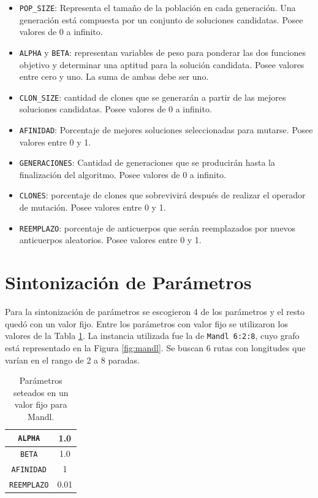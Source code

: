 \documentclass{llncs}
\begin{document}
\begin{itemize}
\item \texttt{POP\_SIZE}: Representa el tamaño de la población en cada generación. Una generación está compuesta por un conjunto de soluciones candidatas. Posee valores de 0 a infinito.
\item \texttt{ALPHA} y \texttt{BETA}: representan variables de peso para ponderar las dos funciones objetivo y determinar una aptitud para la solución candidata. Posee valores entre cero y uno. La suma de ambas debe ser uno.
\item \texttt{CLON\_SIZE}: cantidad de clones que se generarán a partir de las mejores soluciones candidatas.  Posee valores de 0 a infinito.
\item \texttt{AFINIDAD}: Porcentaje de mejores soluciones seleccionadas para mutarse. Posee valores entre 0 y 1.
\item \texttt{GENERACIONES}: Cantidad de generaciones que se producirán hasta la finalización del algoritmo. Posee valores de 0 a infinito.
\item \texttt{CLONES}: porcentaje de clones que sobrevivirá después de realizar el operador de mutación. Posee valores entre 0 y 1.
\item \texttt{REEMPLAZO}: porcentaje de anticuerpos que serán reemplazados por nuevos anticuerpos aleatorios. Posee valores entre 0 y 1.
\end{itemize}

\section{Sintonización de Parámetros}

Para la sintonización de parámetros se escogieron 4 de los parámetros y el resto quedó con un valor fijo. Entre los parámetros con valor fijo se utilizaron los valores de la Tabla \ref{tab:paramfijos}. La instancia utilizada fue la de \texttt{Mandl 6:2:8}, cuyo grafo está representado en la Figura \ref{fig:mandl}. Se buscan 6 rutas con longitudes que varían en el rango de 2 a 8 paradas.

\begin{table}[!htb]
\begin{center}
\begin{tabular}{|c|c|}
\hline
\texttt{ALPHA} & 1.0\\ \hline
\texttt{BETA} & 1.0\\ \hline
\texttt{AFINIDAD} & 1\\ \hline
\texttt{REEMPLAZO} & 0.01\\ \hline
\end{tabular}
\label{tab:paramfijos}
\caption{Parámetros seteados en un valor fijo para Mandl.}
\end{center}
\end{table}
\end{document}
